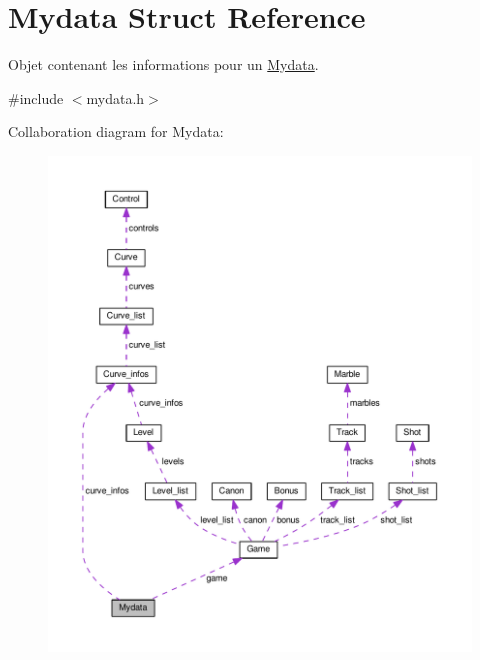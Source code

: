 \hypertarget{struct_mydata}{}\section{Mydata Struct Reference}
\label{struct_mydata}


Objet contenant les informations pour un \hyperlink{struct_mydata}{Mydata}.  




{\ttfamily \#include $<$mydata.\+h$>$}



Collaboration diagram for Mydata\+:
\nopagebreak
\begin{figure}[H]
\begin{center}
\leavevmode
\includegraphics[width=350pt]{struct_mydata__coll__graph}
\end{center}
\end{figure}

